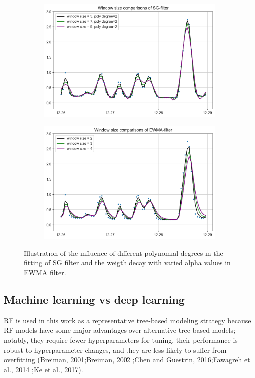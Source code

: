 \begin{figure}[h]
    \centering
    \begin{subfigure}{0.45\textwidth}
      \includegraphics[width=\linewidth]{imgs/pre-processing/sg-filter.png}
      \caption{} \label{fig:smoothed-sg}
    \end{subfigure}%
    \hspace{2em}%
    \begin{subfigure}{0.45\textwidth}
      \includegraphics[width=\linewidth]{imgs/pre-processing/ew-filter.png}
      \caption{} \label{fig:smoothed-ew}
    \end{subfigure}%
  \caption{Illustration of the influence of different polynomial degrees in the fitting of SG filter and the weigth decay with varied alpha values in EWMA filter.} \label{fig:smoothed}
\end{figure}
\subsection{Machine learning vs deep learning}
RF is used in this work as a representative tree-based modeling strategy because RF models have some major advantages over alternative tree-based models; notably, they require fewer hyperparameters for tuning, their performance is robust to hyperparameter changes, and they are less likely to suffer from overfitting (Breiman, 2001;Breiman, 2002 ;Chen and Guestrin, 2016;Fawagreh et al., 2014 ;Ke et al., 2017).
